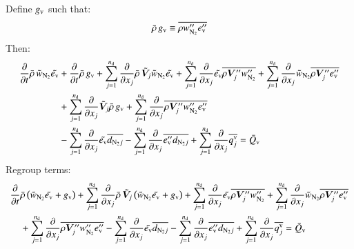 \documentclass{warpdoc}
\newcommand{\alb}{\vspace{0.2cm}\\} %
\newcommand{\nd}{{{n}_{\rm d}}}
\newcommand{\ev}{e_{\rm v}}
\newcommand{\cNtwo}{w_{\rm N_2}}
\begin{document}
%
Define $g_{\rm v}$ such that:
%
\begin{equation}
  \wbar{\rho}\, g_{\rm v} \equiv \overline{\rho \cNtwo^{\prime\prime}  \ev^{\prime\prime}}
  \label{eqn:gv}
\end{equation}
%
Then:
%
\begin{align}
    \frac{\partial}{\partial t} \wbar{\rho}\, {\wtilde{w}_{\rm N_2}}  \wtilde{\ev}
&+    \frac{\partial}{\partial t} \wbar{\rho}\, g_{\rm v} 
+\sum_{j=1}^{\nd} \frac{\partial}{\partial x_j} \wbar{\rho}\, {\wtilde{\bm{V}}_j} {\wtilde{w}_{\rm N_2}} {\wtilde{\ev}}
       +\sum_{j=1}^{\nd} \frac{\partial}{\partial x_j}{\wtilde{\ev}} \overline{\rho \bm{V}_j^{\prime\prime} \cNtwo^{\prime\prime}}+\sum_{j=1}^{\nd} \frac{\partial}{\partial x_j}{\wtilde{w}_{\rm N_2}} \overline{\rho \bm{V}_j^{\prime\prime} \ev^{\prime\prime}}\nonumber\alb
%
       &+\sum_{j=1}^{\nd} \frac{\partial}{\partial x_j}{\wtilde{\bm{V}}_j} \wbar{\rho}\, g_{\rm v}
       +\sum_{j=1}^{\nd} \frac{\partial}{\partial x_j}\overline{\rho \bm{V}_j^{\prime\prime} \cNtwo^{\prime\prime} \ev^{\prime\prime}} \nonumber\alb
   &- \sum_{j=1}^{\nd} \frac{\partial }{\partial x_j} \wtilde{\ev} \overline{d_{{\rm N_2}j}}
   - \sum_{j=1}^{\nd} \frac{\partial }{\partial x_j} \overline{\ev^{\prime\prime} d_{{\rm N_2}j}}
         + \sum_{j=1}^{\nd} \frac{\partial }{\partial x_j} \overline{q_j^{\rm v}} = \wbar{Q}_{\rm v}
\end{align}
%
Regroup terms:
%
\begin{align}
    \frac{\partial}{\partial t} &\wbar{\rho} \left( {\wtilde{w}_{\rm N_2}}  \wtilde{\ev} + g_{\rm v}\right)
+\sum_{j=1}^{\nd} \frac{\partial}{\partial x_j} \wbar{\rho}\, {\wtilde{\bm{V}}_j} \left( {\wtilde{w}_{\rm N_2}} {\wtilde{\ev}} + g_{\rm v}\right)
       +\sum_{j=1}^{\nd} \frac{\partial}{\partial x_j}{\wtilde{\ev}} \overline{\rho \bm{V}_j^{\prime\prime} \cNtwo^{\prime\prime}}+\sum_{j=1}^{\nd} \frac{\partial}{\partial x_j}{\wtilde{w}_{\rm N_2}} \overline{\rho \bm{V}_j^{\prime\prime} \ev^{\prime\prime}}\nonumber\alb
%
       &+\sum_{j=1}^{\nd} \frac{\partial}{\partial x_j}\overline{\rho \bm{V}_j^{\prime\prime} \cNtwo^{\prime\prime} \ev^{\prime\prime}} 
- \sum_{j=1}^{\nd} \frac{\partial }{\partial x_j} \wtilde{\ev} \overline{d_{{\rm N_2}j}}
   - \sum_{j=1}^{\nd} \frac{\partial }{\partial x_j} \overline{\ev^{\prime\prime} d_{{\rm N_2}j}}
         + \sum_{j=1}^{\nd} \frac{\partial }{\partial x_j} \overline{q_j^{\rm v}} = \wbar{Q}_{\rm v}
\label{eqn:NV:final}
\end{align}
%
\end{document}
